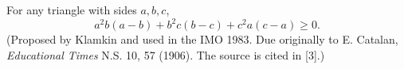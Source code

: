 For any triangle with sides $a, b, c$,
\[ a^2b(a - b) + b^2c(b - c) + c^2a(c - a) \geq 0. \]
(Proposed by Klamkin and used in the IMO 1983. Due originally to E. Catalan, \emph{Educational Times} N.S. 10, 57 (1906). The source is cited in [3].)
